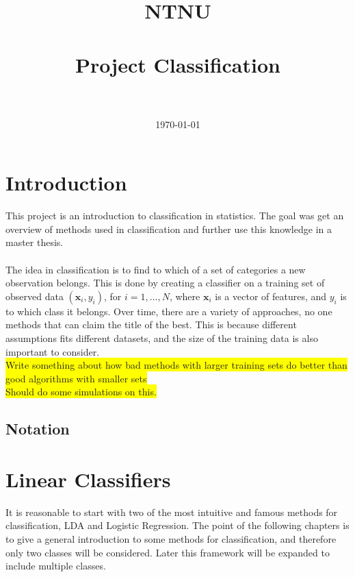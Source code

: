 \documentclass[10pt,a4paper]{article}
\title{	
\normalfont \normalsize 
\textsc{NTNU} \\ [25pt] %
\horrule{0.5pt} \\[0.4cm] %
\huge Project Classification \\ %
\horrule{2pt} \\[0.5cm] %
}
\author{\AuthorName } %
\date{\normalsize\today} %
\begin{document}
\maketitle
\listoftodos{}
%
%
\section{Introduction}
\label{sec:Introduction}
This project is an introduction to classification in statistics. The goal was get an overview of methods used in classification and further use this knowledge in a master thesis. \\
\\
The idea in classification is to find to which of a set of categories a new observation belongs. This is done by creating a classifier on a training set of observed data $(\mathbf{x}_i, y_i)$, for $i = 1, \ldots, N$, where $\mathbf{x}_i$ is a vector of features, and $y_i$ is to which class it belongs. Over time, there are a variety of approaches, no one methods that can claim the title of the best. This is because different assumptions fits different datasets, and the size of the training data is also important to consider. \\
\colorbox{yellow}{Write something about how bad methods with larger training sets do better than good algorithms with smaller sets}\\
\colorbox{yellow}{Should do some simulations on this.}


\subsection{Notation}
\label{sub:Notation}

\section{Linear Classifiers}
\label{sec:Linear Classifiers}
It is reasonable to start with two of the most intuitive and famous methods for classification, LDA and Logistic Regression. The point of the following chapters is to give a general introduction to some methods for classification, and therefore only two classes will be considered. Later this framework will be expanded to include multiple classes.
%
\end{document}
